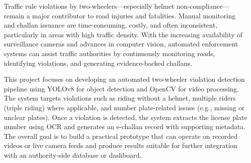 Traffic rule violations by two-wheelers—especially helmet non-compliance—remain a major contributor to road injuries and fatalities. Manual monitoring and challan issuance are time-consuming, costly, and often inconsistent, particularly in areas with high traffic density. With the increasing availability of surveillance cameras and advances in computer vision, automated enforcement systems can assist traffic authorities by continuously monitoring roads, identifying violations, and generating evidence-backed challans.

This project focuses on developing an automated two-wheeler violation detection pipeline using YOLOv8 for object detection and OpenCV for video processing. The system targets violations such as riding without a helmet, multiple riders (triple riding) where applicable, and number plate-related issues (e.g., missing or unclear plates). Once a violation is detected, the system extracts the license plate number using OCR and generates an e-challan record with supporting metadata. The overall goal is to build a practical prototype that can operate on recorded videos or live camera feeds and produce results suitable for further integration with an authority-side database or dashboard.

